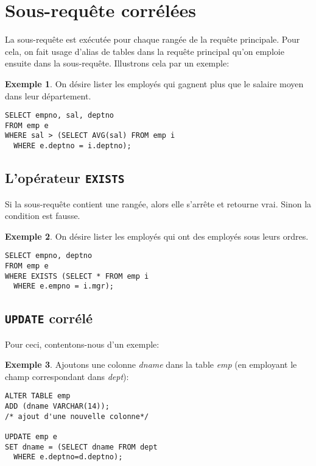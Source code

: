 \documentclass[a4paper, 12pt]{report}
\newcommand{\textSQL}[1]{\texttt{\textbf{#1}}}
\theoremstyle{definition} \newtheorem{ex}{Exemple}
\begin{document}
\section{Sous-requête corrélées}
La sous-requête est exécutée pour chaque rangée de la requête principale. Pour cela, on fait usage d'alias de tables dans la requête principal qu'on emploie ensuite dans la sous-requête. Illustrons cela par un exemple:
\begin{ex}
On désire lister les employés qui gagnent plus que le salaire moyen dans leur département.
\begin{lstlisting}[frame=single]
SELECT empno, sal, deptno
FROM emp e
WHERE sal > (SELECT AVG(sal) FROM emp i
  WHERE e.deptno = i.deptno);
\end{lstlisting}
\end{ex}

\subsection*{L'opérateur \textSQL{EXISTS}}

Si la sous-requête contient une rangée, alors elle s'arrête et retourne vrai. Sinon la condition est fausse.
\begin{ex}
On désire lister les employés qui ont des employés sous leurs ordres.
\begin{lstlisting}[frame=single]
SELECT empno, deptno
FROM emp e
WHERE EXISTS (SELECT * FROM emp i
  WHERE e.empno = i.mgr);
\end{lstlisting}
\end{ex}


\subsection*{\textSQL{UPDATE} corrélé}

Pour ceci, contentons-nous d'un exemple:
\begin{ex}
Ajoutons une colonne \emph{dname} dans la table \emph{emp} (en employant le champ correspondant dans \emph{dept}):
\begin{lstlisting}[frame=single]
ALTER TABLE emp
ADD (dname VARCHAR(14));
/* ajout d'une nouvelle colonne*/

UPDATE emp e
SET dname = (SELECT dname FROM dept
  WHERE e.deptno=d.deptno);
\end{lstlisting}
\end{ex}
\end{document}
